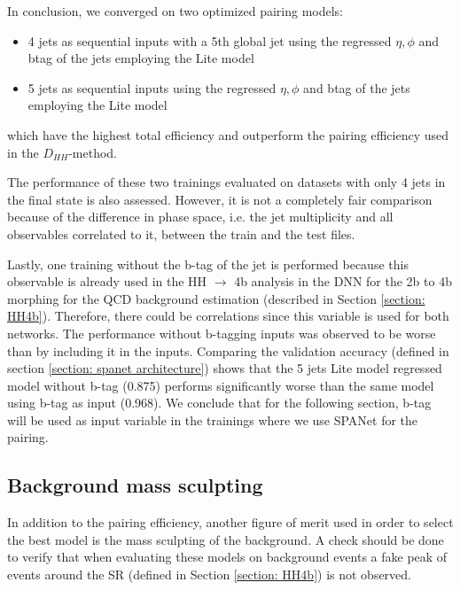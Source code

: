 \clearpage

\noindent In conclusion, we converged on two optimized pairing models:

\begin{itemize} [itemsep=0.1em]
    \item 4 jets as sequential inputs with a 5th global jet using the \pt regressed $\eta, \phi$ and btag of the jets employing the Lite model
    \item 5 jets as sequential inputs using the \pt regressed $\eta, \phi$ and btag of the jets employing the Lite model
\end{itemize}

\noindent which have the highest total efficiency and outperform the pairing efficiency used in the $D_{HH}$-method.

The performance of these two trainings evaluated on datasets with only 4 jets in the final state is also assessed. However,  it is not a completely fair comparison because of the difference in phase space, i.e. the jet multiplicity and all observables correlated to it, between the train and the test files.  

Lastly, one training without the b-tag of the jet is performed because this observable is already used in the HH $\to$ 4b analysis in the DNN for the 2b to 4b morphing for the QCD background estimation (described in Section \ref{section: HH4b}). Therefore, there could be correlations since this variable is used for both networks. The performance without b-tagging inputs was observed to be worse than by including it in the inputs. Comparing the validation accuracy (defined in section \ref{section: spanet architecture}) shows that the 5 jets Lite model \pt regressed model without b-tag (0.875) performs significantly worse than the same model using b-tag as input (0.968). We conclude that for the following section, b-tag will be used as input variable in the trainings where we use SPANet for the pairing.


\subsection{Background mass sculpting} \label{subsection: bckg mass sculpting}
In addition to the pairing efficiency, another figure of merit used in order to select the best model is the mass sculpting of the background.  A check should be done to verify that when evaluating these models on background events a fake peak of events around the SR (defined in Section \ref{section: HH4b}) is not observed. 

